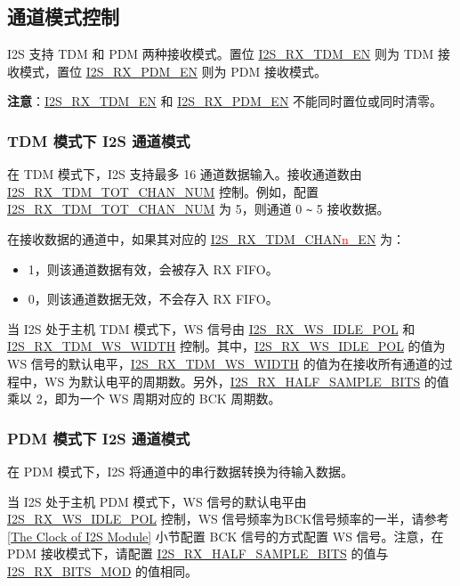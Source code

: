 \documentclass[main\_\_CN.tex]{subfiles}
\begin{document}
\subsection{通道模式控制}
\chipname{} I2S 支持 TDM 和 PDM 两种接收模式。置位 \hyperref[fielddesc:I2SRXTDMEN]{I2S\_RX\_TDM\_EN} 则为 TDM 接收模式，置位 \hyperref[fielddesc:I2SRXPDMEN]{I2S\_RX\_PDM\_EN} 则为 PDM 接收模式。

\textbf{注意}：\hyperref[fielddesc:I2SRXTDMEN]{I2S\_RX\_TDM\_EN} 和 \hyperref[fielddesc:I2SRXPDMEN]{I2S\_RX\_PDM\_EN} 不能同时置位或同时清零。

\subsubsection{TDM 模式下 I2S 通道模式}
在 TDM 模式下，I2S 支持最多 16 通道数据输入。接收通道数由 \hyperref[fielddesc:I2SRXTDMTOTCHANNUM]{I2S\_RX\_TDM\_TOT\_CHAN\_NUM} 控制。例如，配置 \hyperref[fielddesc:I2SRXTDMTOTCHANNUM]{I2S\_RX\_TDM\_TOT\_CHAN\_NUM} 为 5，则通道 0 \verb+~+ 5 接收数据。

在接收数据的通道中，如果其对应的 \hyperref[fielddesc:I2STXTDMCHAN0EN]{I2S\_RX\_TDM\_CHAN{\textcolor{red}{n}}\_EN} 为：
\begin{itemize}
    \item 1，则该通道数据有效，会被存入 RX FIFO。
    \item 0，则该通道数据无效，不会存入 RX FIFO。
\end{itemize}
当 I2S 处于主机 TDM 模式下，WS 信号由 \hyperref[fielddesc:I2SRXWSIDLEPOL]{I2S\_RX\_WS\_IDLE\_POL} 和 \hyperref[fielddesc:I2SRXTDMWSWIDTH]{I2S\_RX\_TDM\_WS\_WIDTH} 控制。其中，\hyperref[fielddesc:I2SRXWSIDLEPOL]{I2S\_RX\_WS\_IDLE\_POL} 的值为 WS 信号的默认电平，\hyperref[fielddesc:I2SRXTDMWSWIDTH]{I2S\_RX\_TDM\_WS\_WIDTH} 的值为在接收所有通道的过程中，WS 为默认电平的周期数。另外，\hyperref[fielddesc:I2SRXHALFSAMPLEBITS]{I2S\_RX\_HALF\_SAMPLE\_BITS} 的值乘以 2，即为一个 WS 周期对应的 BCK 周期数。


\subsubsection{PDM 模式下 I2S 通道模式}
在 PDM 模式下，I2S 将通道中的串行数据转换为待输入数据。


当 I2S 处于主机 PDM 模式下，WS 信号的默认电平由 \hyperref[fielddesc:I2SRXWSIDLEPOL]{I2S\_RX\_WS\_IDLE\_POL} 控制，WS 信号频率为BCK信号频率的一半，请参考 \ref{The Clock of I2S Module} 小节配置 BCK 信号的方式配置 WS 信号。注意，在 PDM 接收模式下，请配置 \hyperref[fielddesc:I2SRXHALFSAMPLEBITS]{I2S\_RX\_HALF\_SAMPLE\_BITS} 的值与 \hyperref[fielddesc:I2SRXBITSMOD]{I2S\_RX\_BITS\_MOD} 的值相同。
\end{document}
